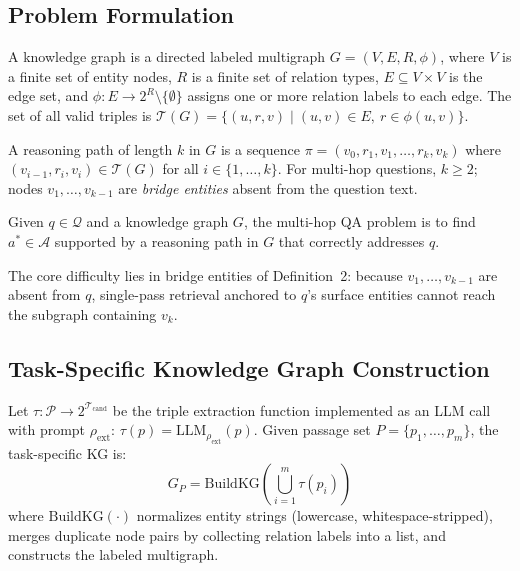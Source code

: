 \documentclass[runningheads]{llncs}
\newcommand{\calT}{\mathcal{T}}
\newcommand{\calQ}{\mathcal{Q}}
\newcommand{\calP}{\mathcal{P}}
\begin{document}
\subsection{Problem Formulation}

\begin{definition}
A knowledge graph is a directed labeled multigraph $G = (V, E, R, \phi)$,
where $V$ is a finite set of entity nodes, $R$ is a finite set of relation
types, $E \subseteq V \times V$ is the edge set, and
$\phi : E \rightarrow 2^{R}\setminus\{\emptyset\}$ assigns one or more
relation labels to each edge. The set of all valid triples is
$\calT(G) = \{(u, r, v) \mid (u,v)\in E,\ r\in\phi(u,v)\}$.
\end{definition}

\begin{definition}
A reasoning path of length $k$ in $G$ is a sequence
$\pi = (v_0, r_1, v_1, \ldots, r_k, v_k)$ where $(v_{i-1}, r_i, v_i)\in\calT(G)$
for all $i\in\{1,\ldots,k\}$. For multi-hop questions, $k\geq 2$; nodes
$v_1,\ldots,v_{k-1}$ are \emph{bridge entities} absent from the question text.
\end{definition}

\begin{definition}
Given $q\in\calQ$ and a knowledge graph $G$, the multi-hop QA problem is to
find $a^*\in\mathcal{A}$ supported by a reasoning path in $G$ that correctly
addresses $q$.
\end{definition}

The core difficulty lies in bridge entities of Definition~2: because
$v_1,\ldots,v_{k-1}$ are absent from $q$, single-pass retrieval anchored to
$q$'s surface entities cannot reach the subgraph containing $v_k$.

\subsection{Task-Specific Knowledge Graph Construction}

\begin{definition}
Let $\tau : \calP \rightarrow 2^{\calT_\text{cand}}$ be the triple extraction
function implemented as an LLM call with prompt $\rho_\text{ext}$:
$\tau(p) = \mathrm{LLM}_{\rho_\text{ext}}(p)$.
Given passage set $P = \{p_1,\ldots,p_m\}$, the task-specific KG is:
\begin{equation}
  G_P = \mathrm{BuildKG}\!\left(\bigcup_{i=1}^{m} \tau(p_i)\right)
  \label{eq:buildkg}
\end{equation}
where $\mathrm{BuildKG}(\cdot)$ normalizes entity strings (lowercase,
whitespace-stripped), merges duplicate node pairs by collecting relation labels
into a list, and constructs the labeled multigraph.
\end{definition}
\end{document}
